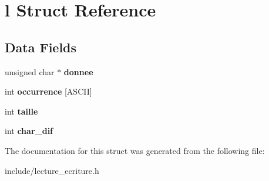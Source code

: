 \hypertarget{structl}{}\section{l Struct Reference}
\label{structl}
\subsection*{Data Fields}
\begin{DoxyCompactItemize}
\item 
\mbox{\label{structl_a7f91e42d29b3afca5f2eae9a499aa921}} 
unsigned char $\ast$ {\bfseries donnee}
\item 
\mbox{\label{structl_a306eeae0b51554320e1f9bb331d0abcd}} 
int {\bfseries occurrence} \mbox{[}A\+S\+C\+II\mbox{]}
\item 
\mbox{\label{structl_a29bf3fc0ffe4e72e45f0c84ab4f8cd1e}} 
int {\bfseries taille}
\item 
\mbox{\label{structl_aebc9cb0b006d6431d7b45383951459e3}} 
int {\bfseries char\+\_\+dif}
\end{DoxyCompactItemize}


The documentation for this struct was generated from the following file\+:\begin{DoxyCompactItemize}
\item 
include/lecture\+\_\+ecriture.\+h\end{DoxyCompactItemize}
